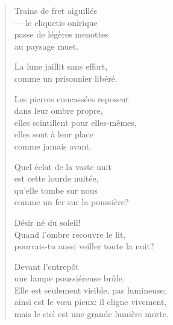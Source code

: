 \documentclass[11pt]{book}
\newcommand*{\centeredornament}{\centerline{\pgfornament[width=6cm]{88}}}
\begin{document}


\begin{verse}
  Trains de fret aiguillés \\
  --- le cliquetis onirique \\
  passe de légères menottes \\
  au paysage muet.

  La lune jaillit sans effort, \\
  comme un prisonnier libéré.

  Les pierres concassées reposent \\
  dans leur ombre propre, \\
  elles scintillent pour elles-mêmes, \\
  elles sont à leur place \\
  comme jamais avant.

  Quel éclat de la vaste nuit \\
  est cette lourde nuitée, \\
  qu'elle tombe sur nous \\
  comme un fer sur la poussière?

  Désir né du soleil! \\
  Quand l'ombre recouvre le lit, \\
  pourrais-tu aussi veiller toute la nuit?

  Devant l'entrepôt \\
  une lampe poussiéreuse brûle. \\
  Elle est seulement visible, pas lumineuse; \\
  ainsi est le vœu pieux: il cligne vivement, \\
  mais le ciel est une grande lumière morte.
\end{verse}

\newpage

\vspace*{-15mm}
\centeredornament


\end{document}
